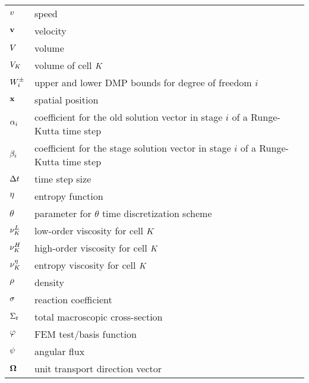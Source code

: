 \begin{center}
\begin{longtable}{l p{4.8in}}
$v$           & speed\\
$\mathbf{v}$        & velocity\\
$V$          & volume\\
$V_K$      & volume of cell $K$\\
$W^\pm_i$      & upper and lower DMP bounds for degree of freedom $i$\\
$\mathbf{x}$               & spatial position\\
$\alpha_i$ & coefficient for the old solution vector in stage
                         $i$ of a Runge-Kutta time step\\
$\beta_i$ & coefficient for the stage solution vector in stage
                           $i$ of a Runge-Kutta time step\\
$\Delta t$    & time step size\\
$\eta$         & entropy function\\
$\theta$           & parameter for $\theta$ time discretization scheme\\

$\lowordercellviscosity$  & low-order viscosity for cell $K$\\
$\highordercellviscosity$ & high-order viscosity for cell $K$\\
$\entropycellviscosity$   & entropy viscosity for cell $K$\\
$\rho$         & density\\
$\sigma$    & reaction coefficient\\
$\Sigma_t$ & total macroscopic cross-section\\
$\varphi$    & FEM test/basis function\\
$\psi$     & angular flux\\
$\mathbf{\Omega}$ & unit transport direction vector\\
\end{longtable}
\end{center}

\pagebreak{}
